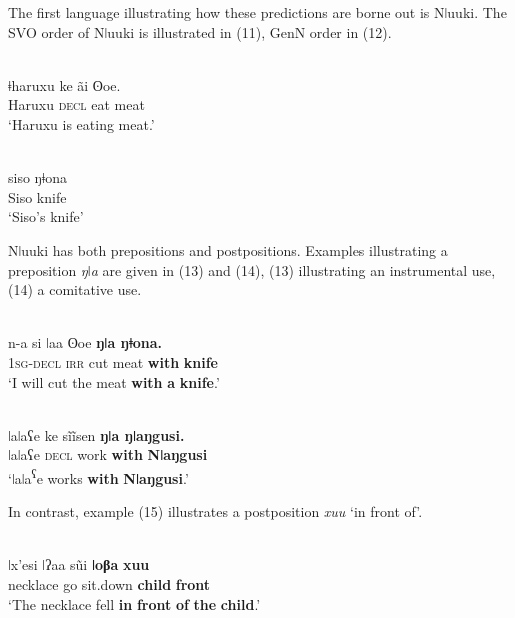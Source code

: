 \documentclass[output=paper]{langsci/langscibook}
\begin{document}
The first language illustrating how these predictions are borne out is Nǀuuki. The SVO order of Nǀuuki is illustrated in (11), GenN order in (12).

\ea\label{ex:dryer:}
\\
\gll ǂharuxu    ke  ãi  ʘoe.\\
       Haruxu  \textsc{decl}  eat  meat \\
\glt ‘Haruxu is eating meat.’  
\z

\ea\label{ex:dryer:}
\\
\gll siso  ŋǂona\\
       Siso  knife\\
\glt   ‘Siso’s knife’
\z

Nǀuuki has both prepositions and postpositions. Examples illustrating a preposition \textit{ŋǀa} are given in (13) and (14), (13) illustrating an instrumental use, (14) a comitative use.

\ea\label{ex:dryer:}
\\
\gll n-a  si  ǀaa  ʘoe  \textbf{ŋǀa  ŋǂona.}\\
       \textsc{1sg-decl}  \textsc{irr}  cut  meat  \textbf{with}  \textbf{knife}  \\
\glt ‘I will cut the meat \textbf{with} \textbf{a} \textbf{knife}.’  
\z

\ea\label{ex:dryer:}
\\
\gll ǀaǀaʕe  ke  sĩĩsen  \textbf{ŋǀa  ŋǀaŋgusi.}\\
       ǀaǀaʕe  \textsc{decl}  work  \textbf{with}  \textbf{Nǀaŋgusi}  \\
\glt ‘ǀaǀa\textsuperscript{ʕ}e works \textbf{with} \textbf{Nǀaŋgusi}.’  
\z

In contrast, example (15) illustrates a postposition \textit{xuu} ‘in front of’.

\ea\label{ex:dryer:}
\\
\gll ǀx’esi  ǀʔaa  s\~ui  \textbf{ǀoβa}  \textbf{xuu}\\
       necklace  go  sit.down  \textbf{child}  \textbf{front}  \\
\glt ‘The necklace fell \textbf{in} \textbf{front} \textbf{of} \textbf{the} \textbf{child}.’ 
\z
\end{document}
